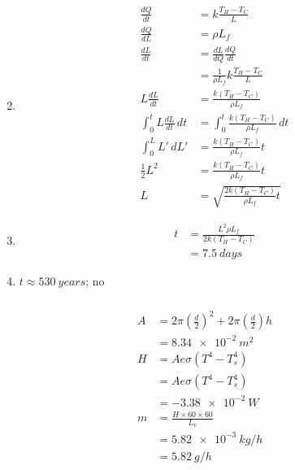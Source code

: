 \documentclass{article}
\begin{document}
\begin{enumerate}
  \setcounter{enumi}{1}
  \item

        \begin{align*}
          \frac{d Q}{d t}                 & = k \frac{T_H - T_C}{L}                        \\
          \frac{d Q}{d L}                 & = \rho L_f                                     \\
          \frac{d L}{d t}                 & = \frac{d L}{d Q} \frac{d Q}{d t}              \\
                                          & = \frac{1}{\rho L_f} k \frac{T_H - T_C}{L}     \\
          L \frac{d L}{d t}               & = \frac{k (T_H - T_C)}{\rho L_f}               \\
          \int_0^t L \frac{d L}{d t} \,dt & = \int_0^t \frac{k (T_H - T_C)}{\rho L_f} \,dt \\
          \int_0^L L' \,dL'               & = \frac{k (T_H - T_C)}{\rho L_f} t             \\
          \frac{1}{2} L^2                 & = \frac{k (T_H - T_C)}{\rho L_f} t             \\
          L                               & = \sqrt{\frac{2 k (T_H - T_C)}{\rho L_f} t}
        \end{align*}

  \item

        \begin{align*}
          t & = \frac{L^2 \rho L_f}{2 k (T_H - T_C)} \\
            & = \qty{7.5}{days}
        \end{align*}

  \item $t \approx \qty{530}{years}$; no
\end{enumerate}

\setcounter{subsubsection}{106}
\subsubsection{}

\begin{align*}
  A & = 2 \pi \left( \frac{d}{2} \right)^2 + 2 \pi \left( \frac{d}{2} \right) h \\
    & = \qty{8.34e-2}{m^2}                                                      \\
  H & = A e \sigma (T^4 - T_s^4)                                                \\
    & = A e \sigma (T^4 - T_s^4)                                                \\
    & = -\qty{3.38e-2}{W}                                                       \\
  m & = \frac{H \times 60 \times 60}{L_v}                                       \\
    & = \qty{5.82e-3}{kg/h}                                                     \\
    & = \qty{5.82}{g/h}
\end{align*}
\end{document}

